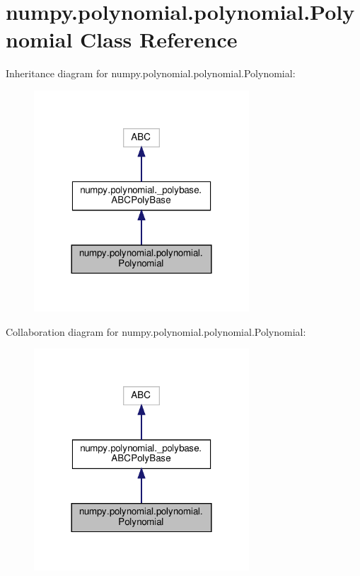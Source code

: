 \hypertarget{classnumpy_1_1polynomial_1_1polynomial_1_1Polynomial}{}\section{numpy.\+polynomial.\+polynomial.\+Polynomial Class Reference}
\label{classnumpy_1_1polynomial_1_1polynomial_1_1Polynomial}


Inheritance diagram for numpy.\+polynomial.\+polynomial.\+Polynomial\+:
\nopagebreak
\begin{figure}[H]
\begin{center}
\leavevmode
\includegraphics[width=228pt]{classnumpy_1_1polynomial_1_1polynomial_1_1Polynomial__inherit__graph}
\end{center}
\end{figure}


Collaboration diagram for numpy.\+polynomial.\+polynomial.\+Polynomial\+:
\nopagebreak
\begin{figure}[H]
\begin{center}
\leavevmode
\includegraphics[width=228pt]{classnumpy_1_1polynomial_1_1polynomial_1_1Polynomial__coll__graph}
\end{center}
\end{figure}
